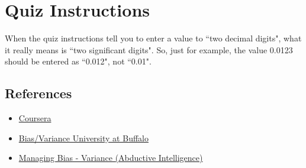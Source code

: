 \section{Quiz Instructions}
When the quiz instructions tell you to enter a value to ``two decimal digits", what it really means is ``two significant digits". So, just for example, the value 0.0123 should be entered as ``0.012", not ``0.01".

\subsection*{References}
\begin{itemize}
\item \href{https://class.coursera.org/ml/lecture/index}{Coursera}
\item \href{http://www.cedar.buffalo.edu/~srihari/CSE555/Chap9.Part2.pdf}{Bias/Variance University at Buffalo}
\item \href{https://blog.stephenpurpura.com/post/13052575854/managing-bias-variance-tradeoff-in-machine}{Managing Bias - Variance (Abductive Intelligence)}
\end{itemize}
